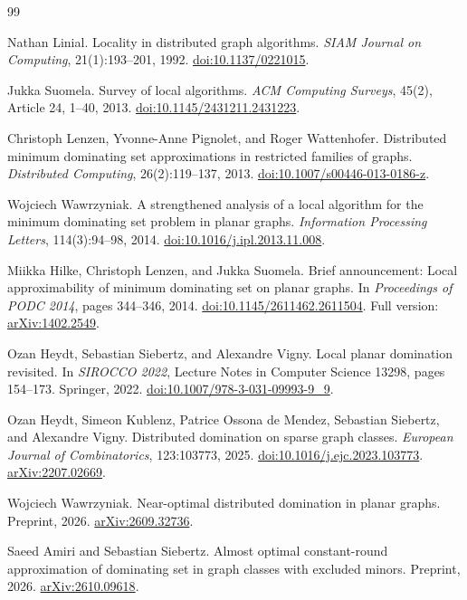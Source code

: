 \documentclass[11pt,a4paper]{article}
\theoremstyle{definition}
\theoremstyle{remark}
\begin{document}
\begin{thebibliography}{99}
\small\raggedright

Nathan Linial.
Locality in distributed graph algorithms.
\emph{SIAM Journal on Computing}, 21(1):193--201, 1992.
\href{https://doi.org/10.1137/0221015}{doi:10.1137/0221015}.

Jukka Suomela.
Survey of local algorithms.
\emph{ACM Computing Surveys}, 45(2), Article 24, 1--40, 2013.
\href{https://doi.org/10.1145/2431211.2431223}{doi:10.1145/2431211.2431223}.

Christoph Lenzen, Yvonne-Anne Pignolet, and Roger Wattenhofer.
Distributed minimum dominating set approximations in restricted families
of graphs.
\emph{Distributed Computing}, 26(2):119--137, 2013.
\href{https://doi.org/10.1007/s00446-013-0186-z}{doi:10.1007/s00446-013-0186-z}.

Wojciech Wawrzyniak.
A strengthened analysis of a local algorithm for the minimum dominating
set problem in planar graphs.
\emph{Information Processing Letters}, 114(3):94--98, 2014.
\href{https://doi.org/10.1016/j.ipl.2013.11.008}{doi:10.1016/j.ipl.2013.11.008}.

Miikka Hilke, Christoph Lenzen, and Jukka Suomela.
Brief announcement: Local approximability of minimum dominating set on
planar graphs.
In \emph{Proceedings of PODC 2014}, pages 344--346, 2014.
\href{https://doi.org/10.1145/2611462.2611504}{doi:10.1145/2611462.2611504}.
Full version: \href{https://arxiv.org/abs/1402.2549}{arXiv:1402.2549}.

Ozan Heydt, Sebastian Siebertz, and Alexandre Vigny.
Local planar domination revisited.
In \emph{SIROCCO 2022}, Lecture Notes in Computer Science 13298,
pages 154--173. Springer, 2022.
\href{https://doi.org/10.1007/978-3-031-09993-9_9}{doi:10.1007/978-3-031-09993-9\_9}.

Ozan Heydt, Simeon Kublenz, Patrice Ossona de Mendez, Sebastian Siebertz,
and Alexandre Vigny.
Distributed domination on sparse graph classes.
\emph{European Journal of Combinatorics}, 123:103773, 2025.
\href{https://doi.org/10.1016/j.ejc.2023.103773}{doi:10.1016/j.ejc.2023.103773}.
\href{https://arxiv.org/abs/2207.02669}{arXiv:2207.02669}.

Wojciech Wawrzyniak.
Near-optimal distributed domination in planar graphs.
Preprint, 2026.
\href{https://arxiv.org/abs/2609.32736}{arXiv:2609.32736}.

Saeed Amiri and Sebastian Siebertz.
Almost optimal constant-round approximation of dominating set in graph
classes with excluded minors.
Preprint, 2026.
\href{https://arxiv.org/abs/2610.09618}{arXiv:2610.09618}.


\end{thebibliography}
\end{document}
